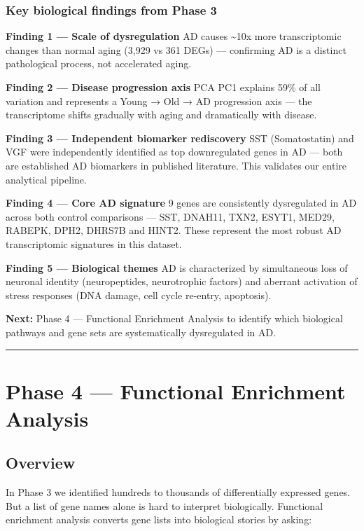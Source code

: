 \documentclass[
]{article}
\begin{document}
\subsubsection{Key biological findings from Phase
3}\label{key-biological-findings-from-phase-3}

\textbf{Finding 1 --- Scale of dysregulation} AD causes
\textasciitilde10x more transcriptomic changes than normal aging (3,929
vs 361 DEGs) --- confirming AD is a distinct pathological process, not
accelerated aging.

\textbf{Finding 2 --- Disease progression axis} PCA PC1 explains 59\% of
all variation and represents a Young → Old → AD progression axis --- the
transcriptome shifts gradually with aging and dramatically with disease.

\textbf{Finding 3 --- Independent biomarker rediscovery} SST
(Somatostatin) and VGF were independently identified as top
downregulated genes in AD --- both are established AD biomarkers in
published literature. This validates our entire analytical pipeline.

\textbf{Finding 4 --- Core AD signature} 9 genes are consistently
dysregulated in AD across both control comparisons --- SST, DNAH11,
TXN2, ESYT1, MED29, RABEPK, DPH2, DHRS7B and HINT2. These represent the
most robust AD transcriptomic signatures in this dataset.

\textbf{Finding 5 --- Biological themes} AD is characterized by
simultaneous loss of neuronal identity (neuropeptides, neurotrophic
factors) and aberrant activation of stress responses (DNA damage, cell
cycle re-entry, apoptosis).

\textbf{Next:} Phase 4 --- Functional Enrichment Analysis to identify
which biological pathways and gene sets are systematically dysregulated
in AD.

\begin{center}\rule{0.5\linewidth}{0.5pt}\end{center}

\section{Phase 4 --- Functional Enrichment
Analysis}\label{phase-4-functional-enrichment-analysis}

\subsection{Overview}\label{overview-3}

In Phase 3 we identified hundreds to thousands of differentially
expressed genes. But a list of gene names alone is hard to interpret
biologically. Functional enrichment analysis converts gene lists into
biological stories by asking:
\end{document}
